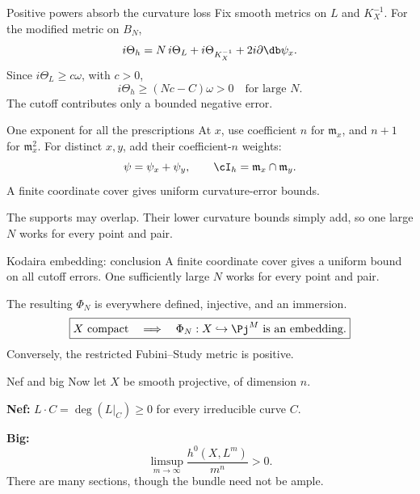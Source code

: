 \begin{frame}{Positive powers absorb the curvature loss}
Fix smooth metrics on \(L\) and \(K_X^{-1}\).
For the modified metric on \(B_N\),
\[
i\Theta_h
=N\,i\Theta_L+i\Theta_{K_X^{-1}}+2i\partial\db\psi_x.
\]
Since \(i\Theta_L\ge c\omega\), with \(c>0\),
\[
\boxed{i\Theta_h\ge(Nc-C)\omega>0\quad\text{for large }N.}
\]
The cutoff contributes only a bounded negative error.
\end{frame}

\begin{frame}{One exponent for all the prescriptions}
At \(x\), use coefficient \(n\) for \(\mathfrak m_x\), and \(n+1\) for \(\mathfrak m_x^2\).
For distinct \(x,y\), add their coefficient-\(n\) weights:
\[
\psi=\psi_x+\psi_y,\qquad
\cI_h=\mathfrak m_x\cap\mathfrak m_y.
\]
A finite coordinate cover gives uniform curvature-error bounds.
\par\bigskip
The supports may overlap. Their lower curvature bounds simply add, so one large \(N\) works for every point and pair.
\end{frame}

\begin{frame}{Kodaira embedding: conclusion}
A finite coordinate cover gives a uniform bound on all cutoff errors.
One sufficiently large \(N\) works for every point and pair.
\par\bigskip
\par The resulting \(\Phi_N\) is everywhere defined, injective, and an immersion.
\[
\boxed{X\ \text{compact}\quad\Longrightarrow\quad
\Phi_N:X\hookrightarrow\Pj^M\ \text{is an embedding}.}
\]
Conversely, the restricted Fubini--Study metric is positive.
\end{frame}



\begin{frame}{Nef and big}
Now let \(X\) be smooth projective, of dimension \(n\).
\par\bigskip
\par \textbf{Nef:} \(L\cdot C=\deg(L|_C)\ge0\) for every irreducible curve \(C\).
\par\bigskip
\par \textbf{Big:}
\[
\limsup_{m\to\infty}\frac{h^0(X,L^m)}{m^n}>0.
\]
There are many sections, though the bundle need not be ample.
\end{frame}

